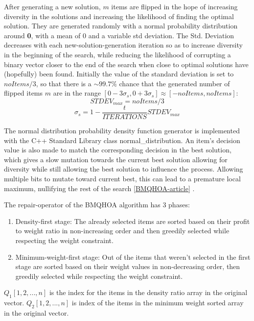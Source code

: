 \documentclass[titlepage]{article}
\begin{document}
After generating a new solution, $m$ items are flipped in the hope of increasing diversity in the solutions and increasing the likelihood of finding the optimal solution. They are generated randomly with a normal probability distribution around \textbf{0}, with a mean of $0$ and a variable std deviation. The Std. Deviation decreases with each new-solution-generation iteration so as to increase diversity in the beginning of the search, while reducing the likelihood of corrupting a binary vector closer to the end of the search when close to optimal solutions have (hopefully) been found. Initially the value of the standard deviation is set to $noItems/3$, so that there is a $\sim 99.7\%$ chance that the generated number of flipped items $m$ are in the range $[0-3\sigma_{s}, 0+3\sigma_{s}] \approx [-noItems, noItems]$:
$$STDEV_{max} = noItems/3$$
$$\sigma_{s} = 1-\frac{t}{ITERATIONS} STDEV_{max}$$


The normal distribution probability density function generator is implemented with the C++ Standard Library class normal\_distribution. An item's decision value is also made to match the corresponding decision in the best solution, which gives a slow mutation towards the current best solution allowing for diversity while still allowing the best solution to influence the process. Allowing multiple bits to mutate toward current best, this can lead to a premature local maximum, nullifying the rest of the search \ref{BMQHOA-article} . 

The repair-operator of the BMQHOA algorithm has 3 phases:
\begin{enumerate}
    \item Density-first stage: The already selected items are sorted based on their profit to weight ratio in non-increasing order and then greedily selected while respecting the weight constraint. 
    \item Minimum-weight-first stage: Out of the items that weren't selected in the first stage are sorted based on their weight values in non-decreasing order, then greedily selected while respecting the weight constraint.   
\end{enumerate}

$Q_{1}[1, 2,...,n]$ is the index for the items in the density ratio array in the original vector. $Q_{2}[1, 2,..., n]$ is index of the items in the minimum weight sorted array in the original vector.
\end{document}
